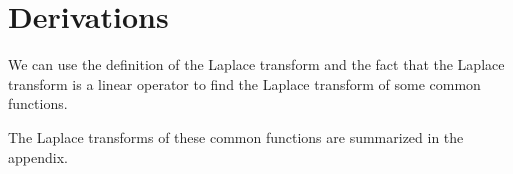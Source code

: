 \section{Derivations}
\noindent
We can use the definition of the Laplace transform and the fact that the Laplace transform is a linear operator to find the Laplace transform of some common functions.










\noindent
The Laplace transforms of these common functions are summarized in the appendix.